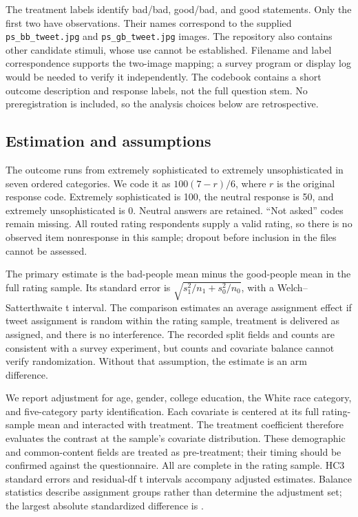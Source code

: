 \documentclass[11pt]{article}
\begin{document}
The treatment labels identify bad/bad, good/bad, and good statements. Only the
first two have observations. Their names correspond to the supplied
\texttt{ps\_bb\_tweet.jpg} and \texttt{ps\_gb\_tweet.jpg} images. The repository
also contains other candidate stimuli, whose use cannot be established.
Filename and label correspondence supports the two-image mapping; a survey
program or display log would be needed to verify it independently. The codebook
contains a short outcome description and response labels, not the full question
stem. No preregistration is included, so the analysis choices below are
retrospective.

\subsection{Estimation and assumptions}

The outcome runs from extremely sophisticated to extremely unsophisticated in
seven ordered categories. We code it as $100(7-r)/6$, where $r$ is the original
response code. Extremely sophisticated is 100, the neutral response is 50, and
extremely unsophisticated is 0. Neutral answers are retained. ``Not asked'' codes
remain missing. All routed rating respondents supply a valid rating, so there
is no observed item nonresponse in this sample; dropout before inclusion in the
files cannot be assessed.

The primary estimate is the bad-people mean minus the good-people mean in the
full rating sample. Its standard error is
$\sqrt{s_1^2/n_1+s_0^2/n_0}$, with a Welch--Satterthwaite t interval.
The comparison estimates an average assignment effect if tweet assignment is
random within the rating sample, treatment is delivered as assigned, and there
is no interference. The recorded split fields and counts are consistent with
a survey experiment, but counts and covariate balance cannot verify randomization.
Without that assumption, the estimate is an arm difference.

We report adjustment for age, gender, college education, the White race
category, and five-category party identification. Each covariate is centered
at its full rating-sample mean and interacted with treatment. The treatment
coefficient therefore evaluates the contrast at the sample's covariate
distribution. These demographic and common-content fields are treated as
pre-treatment; their timing should be confirmed against the questionnaire.
All are complete in the rating sample. HC3 standard errors and residual-df
t intervals accompany adjusted estimates. Balance statistics describe assignment
groups rather than determine the adjustment set; the largest absolute
standardized difference is \MaxBalance{}.
\end{document}
